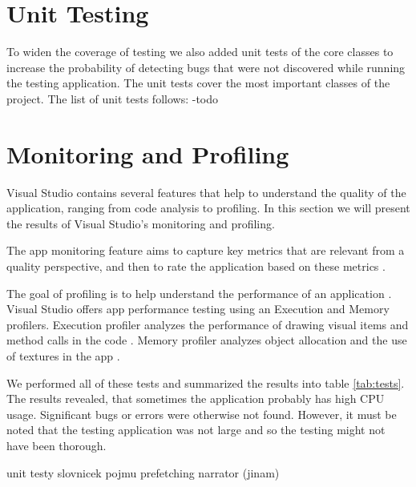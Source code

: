 

\section{Unit Testing}
To widen the coverage of testing we also added unit tests of the core classes to increase the probability of detecting bugs that were not discovered while running the testing application. The unit tests cover the most important classes of the project. The list of unit tests follows:
-todo

\section{Monitoring and Profiling}
Visual Studio contains several features that help to understand the quality of the application, ranging from code analysis to profiling. In this section we will present the results of Visual Studio's monitoring and profiling.

The app monitoring feature aims to capture key metrics that are relevant from a quality perspective, and then to rate the application based on these metrics \cite{wp8monitoring}.

The goal of profiling is to help understand the performance of an application \cite{wp8profiling}. Visual Studio offers app performance testing using an Execution and Memory profilers. Execution profiler analyzes the performance of drawing visual items and method calls in the code \cite{wp8profiling}. Memory profiler analyzes object allocation and the use of textures in the app \cite{wp8profiling}.

We performed all of these tests and summarized the results into table \ref{tab:tests}. The results revealed, that sometimes the application probably has high CPU usage. Significant bugs or errors were otherwise not found. However, it must be noted that the testing application was not large and so the testing might not have been thorough.



unit testy
slovnicek pojmu
prefetching
narrator (jinam)